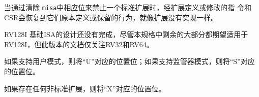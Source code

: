 当通过清除 {\tt misa}中相应位来禁止一个标准扩展时，经扩展定义或修改的指
令和CSR会恢复到它们原本定义或保留的行为，就像扩展没有实现一样。

\iffalse
The design of the RV128I base ISA is not yet complete, and while much of the remainder of this
specification is expected to apply to RV128, this version of the document
focuses only on RV32 and RV64.
\fi

RV128I 基础ISA的设计还没有完成，尽管本规格中剩余的大部分都期望适用于RV128I，但此版本的文档仅关注RV32和RV64。

\iffalse
The ``U'' and ``S'' bits will be set if there is support for user and
supervisor modes respectively.

The ``X'' bit will be set if there are any non-standard extensions.
\fi

如果支持用户模式，则将``U''对应的位置位；如果支持监管器模式，则将``S''对应的位置位。

如果存在任何非标准扩展，则将``X''对应的位置位。

